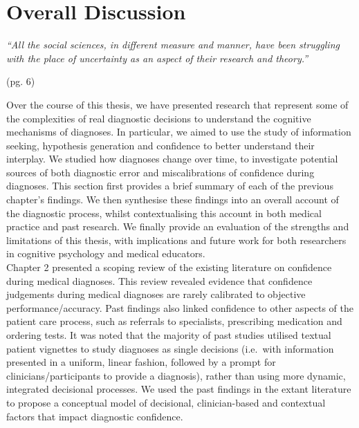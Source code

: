 \documentclass[a4paper, nobind]{templates/ociamthesis}
\begin{document}
\chapter{Overall Discussion}\label{chapter-7}

\adjustmtc
{}

\emph{``All the social sciences, in different measure and manner, have been struggling with the place of uncertainty as an aspect of their research and theory.''}

\autocite{fiddle_uncertainty_1980} (pg. 6)

\hfill\break
Over the course of this thesis, we have presented research that represent some of the complexities of real diagnostic decisions to understand the cognitive mechanisms of diagnoses. In particular, we aimed to use the study of information seeking, hypothesis generation and confidence to better understand their interplay. We studied how diagnoses change over time, to investigate potential sources of both diagnostic error and miscalibrations of confidence during diagnoses. This section first provides a brief summary of each of the previous chapter's findings. We then synthesise these findings into an overall account of the diagnostic process, whilst contextualising this account in both medical practice and past research. We finally provide an evaluation of the strengths and limitations of this thesis, with implications and future work for both researchers in cognitive psychology and medical educators.\\

Chapter 2 presented a scoping review of the existing literature on confidence during medical diagnoses. This review revealed evidence that confidence judgements during medical diagnoses are rarely calibrated to objective performance/accuracy. Past findings also linked confidence to other aspects of the patient care process, such as referrals to specialists, prescribing medication and ordering tests. It was noted that the majority of past studies utilised textual patient vignettes to study diagnoses as single decisions (i.e.~with information presented in a uniform, linear fashion, followed by a prompt for clinicians/participants to provide a diagnosis), rather than using more dynamic, integrated decisional processes. We used the past findings in the extant literature to propose a conceptual model of decisional, clinician-based and contextual factors that impact diagnostic confidence.\\
\end{document}
